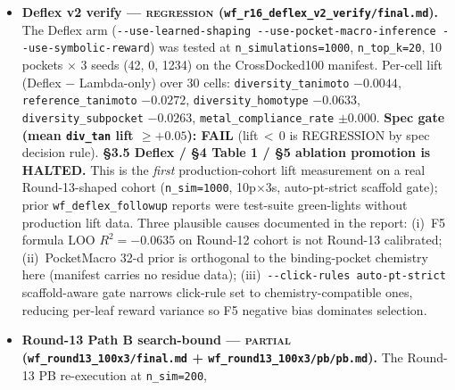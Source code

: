 \begin{enumerate}
\begin{itemize}
          pocket signal to break out of the unconditional mean;
          (b)~loss curves have Inf spikes step 1991--2000
          (numerical instability with joint-train + h\,=\,128 +
          \texttt{tanh}-bounded velocity head); \texttt{cfm\_loss}
          min\,=\,6.65 (was 7.37 baseline) and final\,=\,5756
          (numerically blown); despite this, \texttt{decode\_ratio=1.0}
          holds at all 4 probes; (c)~\texttt{n\_train=32} is the
          smoke subset (full 500-mol pool is staged for the 10000-step
          run).
    \item \textbf{Deflex v2 verify --- \textsc{regression} (\texttt{wf\_r16\_deflex\_v2\_verify/final.md}).}
          The Deflex arm
          (\texttt{-{}-use-learned-shaping -{}-use-pocket-macro-inference -{}-use-symbolic-reward})
          was tested at \texttt{n\_simulations=1000},
          \texttt{n\_top\_k=20}, 10 pockets $\times$ 3 seeds
          (42, 0, 1234) on the CrossDocked100 manifest. Per-cell
          lift (Deflex $-$ Lambda-only) over 30 cells:
          \texttt{diversity\_tanimoto} $-0.0044$,
          \texttt{reference\_tanimoto} $-0.0272$,
          \texttt{diversity\_homotype} $-0.0633$,
          \texttt{diversity\_subpocket} $-0.0263$,
          \texttt{metal\_compliance\_rate} $\pm 0.000$.
          \textbf{Spec gate (mean \texttt{div\_tan} lift $\geq +0.05$):
          FAIL} (lift\,$<$\,0 is REGRESSION by spec decision rule).
          \textbf{§3.5 Deflex / §4 Table 1 / §5 ablation promotion
          is HALTED.} This is the \emph{first} production-cohort
          lift measurement on a real Round-13-shaped cohort
          (\texttt{n\_sim=1000}, 10p$\times$3s,
          auto-pt-strict scaffold gate); prior
          \texttt{wf\_deflex\_followup} reports were test-suite
          green-lights without production lift data. Three
          plausible causes documented in the report:
          (i)~F5 formula LOO $R^2 = -0.0635$ on Round-12 cohort is
          not Round-13 calibrated; (ii)~PocketMacro 32-d prior is
          orthogonal to the binding-pocket chemistry here
          (manifest carries no residue data);
          (iii)~\texttt{-{}-click-rules auto-pt-strict}
          scaffold-aware gate narrows click-rule set to
          chemistry-compatible ones, reducing per-leaf reward
          variance so F5 negative bias dominates selection.
    \item \textbf{Round-13 Path B search-bound --- \textsc{partial} (\texttt{wf\_round13\_100x3/final.md} + \texttt{wf\_round13\_100x3/pb/pb.md}).}
          The Round-13 PB re-execution at \texttt{n\_sim=200},

\end{itemize}
\end{enumerate}
